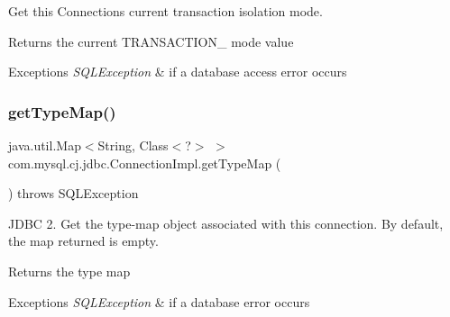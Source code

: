 Get this Connection\textquotesingle{}s current transaction isolation mode.

\begin{DoxyReturn}{Returns}
the current T\+R\+A\+N\+S\+A\+C\+T\+I\+O\+N\+\_\+ mode value 
\end{DoxyReturn}

\begin{DoxyExceptions}{Exceptions}
{\em S\+Q\+L\+Exception} & if a database access error occurs \\
\hline
\end{DoxyExceptions}
\mbox{\label{classcom_1_1mysql_1_1cj_1_1jdbc_1_1_connection_impl_a9960d23d0f9d8c6990c184e0a3e3630c}} 
\subsubsection{\texorpdfstring{get\+Type\+Map()}{getTypeMap()}}
{\footnotesize\ttfamily java.\+util.\+Map$<$String, Class$<$?$>$ $>$ com.\+mysql.\+cj.\+jdbc.\+Connection\+Impl.\+get\+Type\+Map (\begin{DoxyParamCaption}{ }\end{DoxyParamCaption}) throws S\+Q\+L\+Exception}

J\+D\+BC 2. Get the type-\/map object associated with this connection. By default, the map returned is empty.

\begin{DoxyReturn}{Returns}
the type map 
\end{DoxyReturn}

\begin{DoxyExceptions}{Exceptions}
{\em S\+Q\+L\+Exception} & if a database error occurs \\
\hline
\end{DoxyExceptions}
\mbox{\label{classcom_1_1mysql_1_1cj_1_1jdbc_1_1_connection_impl_a098f1e77842e56a64fad3854686fbe8a}} 
